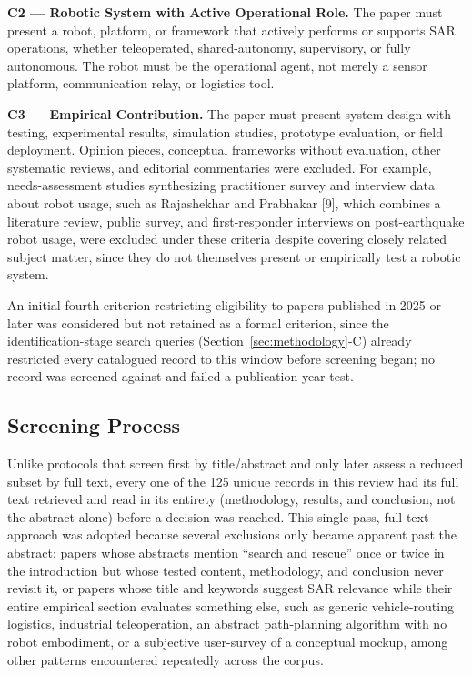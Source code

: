 \documentclass[journal]{IEEEtran}
\begin{document}
\textbf{C2 --- Robotic System with Active Operational Role.} The paper must present a robot, platform, or framework that actively performs or supports SAR operations, whether teleoperated, shared-autonomy, supervisory, or fully autonomous. The robot must be the operational agent, not merely a sensor platform, communication relay, or logistics tool.

\textbf{C3 --- Empirical Contribution.} The paper must present system design with testing, experimental results, simulation studies, prototype evaluation, or field deployment. Opinion pieces, conceptual frameworks without evaluation, other systematic reviews, and editorial commentaries were excluded. For example, needs-assessment studies synthesizing practitioner survey and interview data about robot usage, such as Rajashekhar and Prabhakar [9], which combines a literature review, public survey, and first-responder interviews on post-earthquake robot usage, were excluded under these criteria despite covering closely related subject matter, since they do not themselves present or empirically test a robotic system.

An initial fourth criterion restricting eligibility to papers published in 2025 or later was considered but not retained as a formal criterion, since the identification-stage search queries (Section~\ref{sec:methodology}-C) already restricted every catalogued record to this window before screening began; no record was screened against and failed a publication-year test.

\subsection{Screening Process}

Unlike protocols that screen first by title/abstract and only later assess a reduced subset by full text, every one of the 125 unique records in this review had its full text retrieved and read in its entirety (methodology, results, and conclusion, not the abstract alone) before a decision was reached. This single-pass, full-text approach was adopted because several exclusions only became apparent past the abstract: papers whose abstracts mention ``search and rescue'' once or twice in the introduction but whose tested content, methodology, and conclusion never revisit it, or papers whose title and keywords suggest SAR relevance while their entire empirical section evaluates something else, such as generic vehicle-routing logistics, industrial teleoperation, an abstract path-planning algorithm with no robot embodiment, or a subjective user-survey of a conceptual mockup, among other patterns encountered repeatedly across the corpus.
\end{document}
